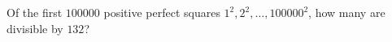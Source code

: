 Of the first $100000$ positive perfect squares $1^2,2^2,\dots,100000^2$, how many are divisible by $132$?
